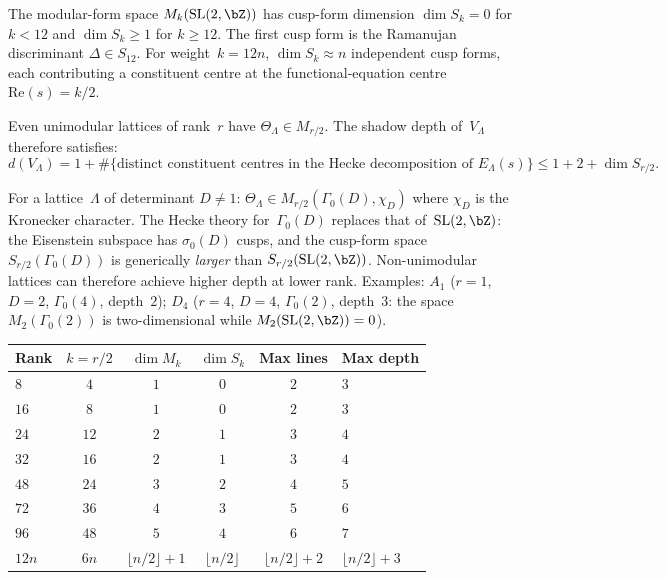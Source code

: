 The modular-form space $M_k(\mathrm{SL}(2,\bZ))$ has cusp-form
dimension $\dim S_k = 0$ for $k<12$ and $\dim S_k \ge 1$ for
$k\ge 12$. The first cusp form is the Ramanujan discriminant
$\Delta\in S_{12}$. For weight~$k=12n$, $\dim S_k\approx n$
independent cusp forms, each contributing a constituent centre at
the functional-equation centre $\mathrm{Re}(s)=k/2$.

Even unimodular lattices of rank~$r$ have
$\Theta_\Lambda\in M_{r/2}$. The shadow depth of~$V_\Lambda$
therefore satisfies:
\begin{equation}\label{eq:depth-from-rank}
 d(V_\Lambda)
 = 1 + \#\{\text{distinct constituent centres in the Hecke
 decomposition of }E_\Lambda(s)\}
 \le 1 + 2 + \dim S_{r/2}.
\end{equation}

\begin{remark}
\label{rem:non-unimodular}
\ClaimStatusProvedHere
{}
For a lattice~$\Lambda$ of determinant $D \neq 1$:
$\Theta_\Lambda \in M_{r/2}(\Gamma_0(D), \chi_D)$ where
$\chi_D$ is the Kronecker character. The Hecke theory
for~$\Gamma_0(D)$ replaces that of~$\mathrm{SL}(2,\bZ)$:
the Eisenstein subspace has $\sigma_0(D)$ cusps, and the
cusp-form space $S_{r/2}(\Gamma_0(D))$ is generically
\emph{larger} than $S_{r/2}(\mathrm{SL}(2,\bZ))$.
Non-unimodular lattices can therefore achieve higher depth
at lower rank. Examples: $A_1$ ($r{=}1$, $D{=}2$,
$\Gamma_0(4)$, depth~$2$); $D_4$ ($r{=}4$, $D{=}4$,
$\Gamma_0(2)$, depth~$3$: the space $M_2(\Gamma_0(2))$ is
two-dimensional while $M_2(\mathrm{SL}(2,\bZ)) = 0$).
\end{remark}

\begin{center}
\renewcommand{\arraystretch}{1.2}
\begin{tabular}{lccccl}
\hline
\textbf{Rank} & $k{=}r/2$ & $\dim M_k$ & $\dim S_k$
 & \textbf{Max lines} & \textbf{Max depth}\\
\hline
$8$ & $4$ & $1$ & $0$ & $2$ & $3$\\
$16$ & $8$ & $1$ & $0$ & $2$ & $3$\\
$24$ & $12$ & $2$ & $1$ & $3$ & $4$\\
$32$ & $16$ & $2$ & $1$ & $3$ & $4$\\
$48$ & $24$ & $3$ & $2$ & $4$ & $5$\\
$72$ & $36$ & $4$ & $3$ & $5$ & $6$\\
$96$ & $48$ & $5$ & $4$ & $6$ & $7$\\
$12n$ & $6n$ & $\lfloor n/2\rfloor{+}1$ & $\lfloor n/2\rfloor$
 & $\lfloor n/2\rfloor{+}2$ & $\lfloor n/2\rfloor{+}3$\\
\hline
\end{tabular}
\end{center}

